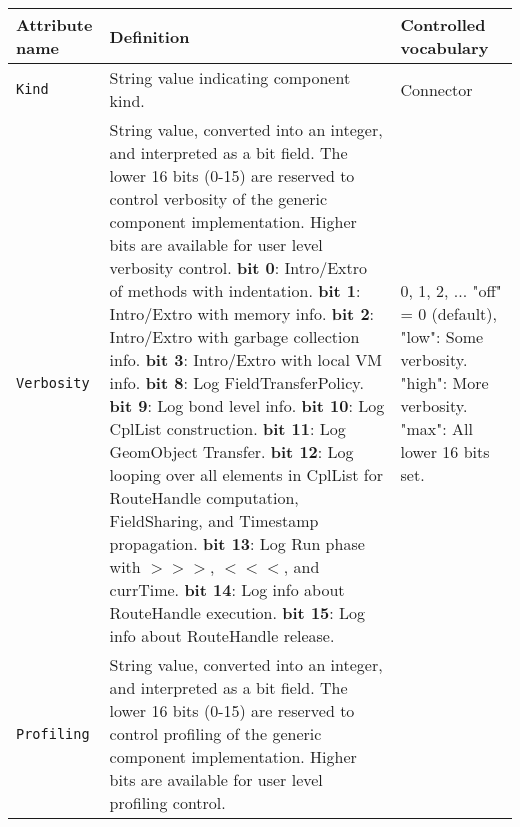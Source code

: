 \begin{longtable}{|p{}|p{}|p{}|}
     \hline\hline
     {\bf Attribute name} & {\bf Definition} & {\bf Controlled vocabulary}\\
     \hline\hline
     {\tt Kind} & String value indicating component kind.& Connector\\ \hline
     {\tt Verbosity} & String value, converted into an integer, and interpreted as a bit field. The lower 16 bits (0-15) are reserved to control verbosity of the generic component implementation. Higher bits are available for user level verbosity control. \newline
                       {\bf bit 0}: Intro/Extro of methods with indentation.\newline
                       {\bf bit 1}: Intro/Extro with memory info.\newline
                       {\bf bit 2}: Intro/Extro with garbage collection info.\newline
                       {\bf bit 3}: Intro/Extro with local VM info.\newline
                       {\bf bit 8}: Log FieldTransferPolicy.\newline
                       {\bf bit 9}: Log bond level info.\newline
                       {\bf bit 10}: Log CplList construction.\newline
                       {\bf bit 11}: Log GeomObject Transfer.\newline
                       {\bf bit 12}: Log looping over all elements in CplList for RouteHandle computation, FieldSharing, and Timestamp propagation.\newline
                       {\bf bit 13}: Log Run phase with $>>>$, $<<<$, and currTime.\newline
                       {\bf bit 14}: Log info about RouteHandle execution.\newline
                       {\bf bit 15}: Log info about RouteHandle release.
                     & 0, 1, 2, ... \newline
                       "off" = 0 (default), \newline
                       "low": Some verbosity. \newline
                       "high": More verbosity. \newline
                       "max": All lower 16 bits set.\\ \hline
     {\tt Profiling} & String value, converted into an integer, and interpreted as a bit field. The lower 16 bits (0-15) are reserved to control profiling of the generic component implementation. Higher bits are available for user level profiling control. \newline

\end{longtable}
